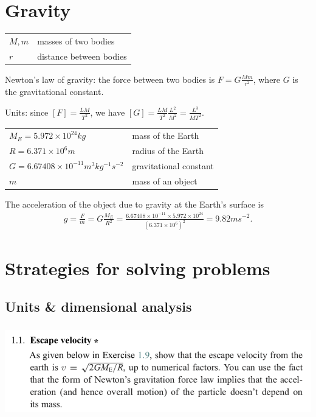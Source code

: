 \section{Gravity}
\begin{tabular*}{1.0\linewidth}{l|l}
  $M, m$ & masses of two bodies \\
  $r$    & distance between bodies
\end{tabular*}

Newton's law of gravity: the force between two bodies is $F = G\frac{Mm}{r^2}$, where $G$ is the
gravitational constant.

Units: since $[F] = \frac{LM}{T^2}$, we have $[G] = \frac{LM}{T^2}\frac{L^2}{M^2} = \frac{L^3}{MT^2}$.

\begin{tabular*}{1.0\linewidth}{l|l}
  $M_E = 5.972 \times 10^{24} kg$ & mass of the Earth \\
  $R =  6.371 \times 10^6 m$     & radius of the Earth \\
  $G = 6.67408 \times 10^{-11} m^3 kg^{-1} s^{-2}$        & gravitational constant\\
  $m$ & mass of an object
\end{tabular*}

The acceleration of the object due to gravity at the Earth's surface is
\begin{align*}
  g
  = \frac{F}{m}
  = G\frac{M_E}{R^2}
  = \frac{6.67408 \times 10^{-11} \times 5.972 \times 10^{24}}{(6.371 \times 10^6)^2}
  = 9.82 ms^{-2}.
\end{align*}


\section{Strategies for solving problems}
\subsection*{Units \& dimensional analysis}
\subsubsection*{}
\begin{mdframed}
  \includegraphics[width=400pt]{img/physics--classical-mechanics--morin--1-1.png}
\end{mdframed}

